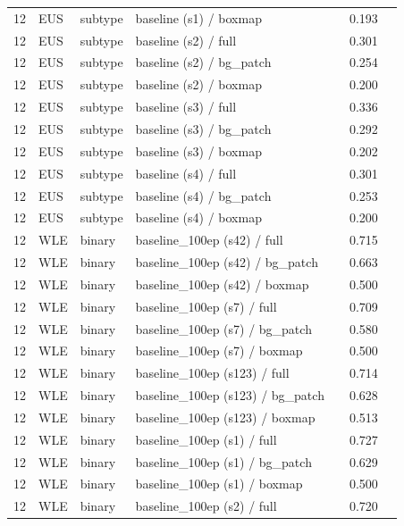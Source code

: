 \begin{longtable}{cL{1.1cm}L{1.5cm}L{5.6cm}ccc}
12 & EUS & subtype & baseline (s1) / boxmap & \nl{} & 0.193 & \nl{} \\
12 & EUS & subtype & baseline (s2) / full & \nl{} & 0.301 & \nl{} \\
12 & EUS & subtype & baseline (s2) / bg\_patch & \nl{} & 0.254 & \nl{} \\
12 & EUS & subtype & baseline (s2) / boxmap & \nl{} & 0.200 & \nl{} \\
12 & EUS & subtype & baseline (s3) / full & \nl{} & 0.336 & \nl{} \\
12 & EUS & subtype & baseline (s3) / bg\_patch & \nl{} & 0.292 & \nl{} \\
12 & EUS & subtype & baseline (s3) / boxmap & \nl{} & 0.202 & \nl{} \\
12 & EUS & subtype & baseline (s4) / full & \nl{} & 0.301 & \nl{} \\
12 & EUS & subtype & baseline (s4) / bg\_patch & \nl{} & 0.253 & \nl{} \\
12 & EUS & subtype & baseline (s4) / boxmap & \nl{} & 0.200 & \nl{} \\
12 & WLE & binary & baseline\_100ep (s42) / full & \nl{} & 0.715 & \nl{} \\
12 & WLE & binary & baseline\_100ep (s42) / bg\_patch & \nl{} & 0.663 & \nl{} \\
12 & WLE & binary & baseline\_100ep (s42) / boxmap & \nl{} & 0.500 & \nl{} \\
12 & WLE & binary & baseline\_100ep (s7) / full & \nl{} & 0.709 & \nl{} \\
12 & WLE & binary & baseline\_100ep (s7) / bg\_patch & \nl{} & 0.580 & \nl{} \\
12 & WLE & binary & baseline\_100ep (s7) / boxmap & \nl{} & 0.500 & \nl{} \\
12 & WLE & binary & baseline\_100ep (s123) / full & \nl{} & 0.714 & \nl{} \\
12 & WLE & binary & baseline\_100ep (s123) / bg\_patch & \nl{} & 0.628 & \nl{} \\
12 & WLE & binary & baseline\_100ep (s123) / boxmap & \nl{} & 0.513 & \nl{} \\
12 & WLE & binary & baseline\_100ep (s1) / full & \nl{} & 0.727 & \nl{} \\
12 & WLE & binary & baseline\_100ep (s1) / bg\_patch & \nl{} & 0.629 & \nl{} \\
12 & WLE & binary & baseline\_100ep (s1) / boxmap & \nl{} & 0.500 & \nl{} \\
12 & WLE & binary & baseline\_100ep (s2) / full & \nl{} & 0.720 & \nl{} \\

\end{longtable}
